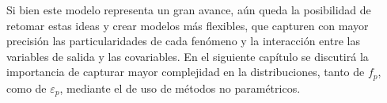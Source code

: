 Si bien este modelo representa un gran avance, a\'un queda la posibilidad de retomar estas ideas y crear modelos m\'as flexibles, que capturen con mayor precisi\'on las particularidades de cada fen\'omeno y la interacci\'on entre las variables de salida y las covariables. En el siguiente cap\'itulo se discutir\'a la importancia de capturar mayor complejidad en la distribuciones, tanto de $f_p$, como de $\varepsilon_p$, mediante el de uso de m\'etodos no param\'etricos.